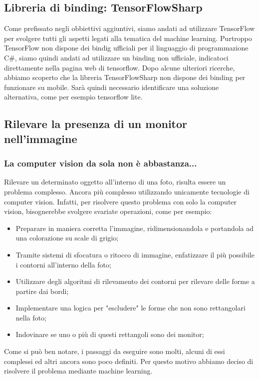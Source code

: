 \documentclass[twoside]{supsistudent}
\newcommand{\Decaa}{\newline\vspace{0.5mm}\newline\noindent}
\begin{document}
\subsection{Libreria di binding: TensorFlowSharp}
Come prefissato negli obbiettivi aggiuntivi, siamo andati ad utilizzare TensorFlow per svolgere tutti gli aspetti legati alla tematica del machine learning. Purtroppo TensorFlow non dispone dei bindig ufficiali per il linguaggio di programmazione  C\#, siamo quindi andati ad utilizzare un binding non ufficiale, indicatoci direttamente nella pagina web di tensorflow.
\Decaa
Dopo alcune ulteriori ricerche, abbiamo scoperto che la libreria TensorFlowSharp non dispone dei binding per funzionare su mobile. Sarà quindi necessario identificare una soluzione alternativa, come per esempio tensorflow lite.

\subsection{Rilevare la presenza di un monitor nell'immagine}
\subsubsection{La computer vision da sola non è abbastanza...}
Rilevare un determinato oggetto all'interno di una foto, risulta essere un problema complesso. Ancora più complesso utilizzando unicamente tecnologie di computer vision. Infatti, per risolvere questo problema con solo la computer vision, bisognerebbe svolgere svariate operazioni, come per esempio:
\begin{itemize}
\item Preparare in maniera corretta l'immagine, ridimensionandola e portandola ad una colorazione su scale di grigio;
\item Tramite sistemi di sfocatura o ritocco di immagine, enfatizzare il più possibile i contorni all'interno della foto;
\item Utilizzare degli algoritmi di rilevamento dei contorni per rilevare delle forme a partire dai bordi;
\item Implementare una logica per "escludere" le forme che non sono rettangolari nella foto;
\item Indovinare se uno o più di questi rettangoli sono dei monitor;
\end{itemize}
Come si può ben notare, i passaggi da eseguire sono molti, alcuni di essi complessi ed altri ancora sono poco definiti. Per questo motivo abbiamo deciso di risolvere il problema mediante machine learning.
\end{document}
